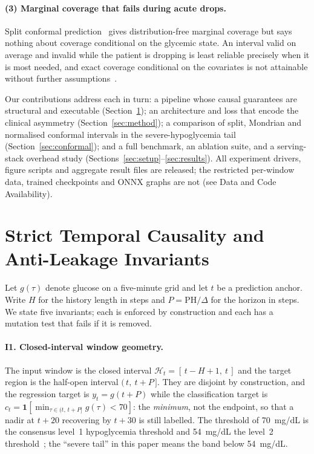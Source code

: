 \documentclass[pmlr,twocolumn,10pt]{jmlr}
\newcommand{\PH}{\mathrm{PH}}
\newcommand{\ind}{\mathbf{1}}
\begin{document}
\paragraph{(3) Marginal coverage that fails during acute drops.} Split conformal
prediction~\citep{papadopoulos2002inductive,vovk2005algorithmic,angelopoulos2023gentle}
gives distribution-free marginal coverage but says nothing about coverage
conditional on the glycemic state. An interval valid on average and invalid
while the patient is dropping is least reliable precisely when it is most
needed, and exact coverage conditional on the covariates is not attainable
without further assumptions~\citep{lei2014distribution,vovk2012conditional}.

Our contributions address each in turn: a pipeline whose causal guarantees are
structural and executable (Section~\ref{sec:causality}); an architecture and
loss that encode the clinical asymmetry (Section~\ref{sec:method}); a comparison
of split, Mondrian and normalised conformal intervals in the severe-hypoglycemia
tail (Section~\ref{sec:conformal}); and a full benchmark, an ablation suite,
and a serving-stack overhead study
(Sections~\ref{sec:setup}--\ref{sec:results}).
All experiment drivers, figure scripts and aggregate result files are
released; the restricted per-window data, trained checkpoints and ONNX graphs
are not (see Data and Code Availability).

\section{Strict Temporal Causality and Anti-Leakage Invariants}
\label{sec:causality}

Let $g(\tau)$ denote glucose on a five-minute grid and let $t$ be a prediction
anchor. Write $H$ for the history length in steps and $P = \PH / \Delta$ for the
horizon in steps. We state five invariants; each is enforced by construction and
each has a mutation test that fails if it is removed.

\paragraph{I1. Closed-interval window geometry.} The input window is the closed
interval $\mathcal{H}_t = [\,t - H + 1,\ t\,]$ and the target region is the
half-open interval $(\,t,\ t + P\,]$. They are disjoint by construction, and the
regression target is $y_t = g(t + P)$ while the classification target is
$c_t = \ind\!\left[\min_{\tau \in (t,\,t+P]} g(\tau) < 70\right]$: the
\emph{minimum}, not the endpoint, so that a nadir at $t+20$ recovering by $t+30$
is still labelled. The threshold of 70~mg/dL is the consensus level~1
hypoglycemia threshold and 54~mg/dL the level~2
threshold~\citep{battelino2019clinical,ada2023glycemic}; the ``severe tail'' in
this paper means the band below 54~mg/dL.
\end{document}
